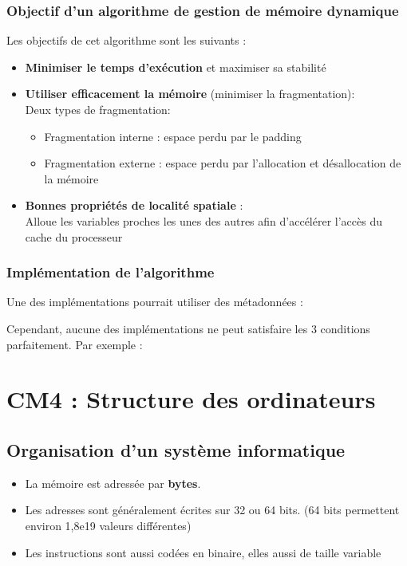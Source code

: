 \documentclass{article}
\newcommand{\insertslide}[2]{
\begin{center}
    \fbox{\texttt{[image: \#1]}}
\end{center}
}
\begin{document}
        \subsubsection{Objectif d'un algorithme de gestion de mémoire dynamique}
            Les objectifs de cet algorithme sont les suivants :
            \begin{itemize}
                \item \textbf{Minimiser le temps d'exécution} et maximiser sa stabilité
                \item \textbf{Utiliser efficacement la mémoire} (minimiser la fragmentation):\\
                Deux types de fragmentation:
                \begin{itemize}
                    \item Fragmentation interne : espace perdu par le padding
                    \item Fragmentation externe : espace perdu par l'allocation et désallocation de la mémoire
                \end{itemize}
                \item \textbf{Bonnes propriétés de localité spatiale} :\\
                Alloue les variables proches les unes des autres afin d'accélérer l'accès du cache du processeur
            \end{itemize}
        
        \subsubsection{Implémentation de l'algorithme}
            Une des implémentations pourrait utiliser des métadonnées :
            \insertslide{Slides/CM3}{48}
\pagebreak
            Cependant, aucune des implémentations ne peut satisfaire les 3 conditions parfaitement.
            Par exemple :
            \insertslide{Slides/CM3}{55}
\pagebreak
\section{CM4 : Structure des ordinateurs}
    \subsection{Organisation d'un système informatique}
        \begin{itemize}
            \item La mémoire est adressée par \textbf{bytes}.
            \item Les adresses sont généralement écrites sur 32 ou 64 bits. (64 bits permettent environ 1,8e19 valeurs différentes)
            \item Les instructions sont aussi codées en binaire, elles aussi de taille variable
        \end{itemize}
\end{document}
